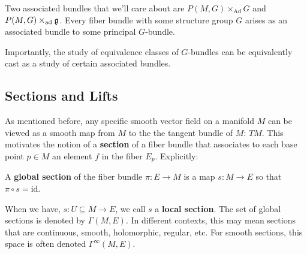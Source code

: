 		
%
		
		Two associated bundles that we'll care about are $P(M,G) \times_{\mathrm{Ad}} G$ and $P(M,G) \times_{\mathrm{ad}} \frak g$.
		Every fiber bundle with some structure group $G$ arises as an associated bundle to some principal $G$-bundle.
		
		Importantly, the study of equivalence classes of $G$-bundles can be equivalently cast as a study of certain associated bundles. 
		
		\subsection{Sections and Lifts}
		
		As mentioned before, any specific smooth vector field on a manifold $M$ can be viewed as a smooth map from $M$ to the the tangent bundle of $M$: $TM$. This motivates the notion of a \textbf{section} of a fiber bundle that associates to each base point $p\in M$ an element $f$ in the fiber $E_p$. Explicitly:
		\begin{defn}
			A \textbf{global section} of the fiber bundle $\pi: E \rightarrow M$ is a map $s: M \rightarrow E$ so that $\pi \circ s = \text{id}$. 
			
			When we have, $s: U \subseteq M \rightarrow E$, we call $s$ a \textbf{local section}. The set of global sections is denoted by $\Gamma(M, E)$. In different contexts, this may mean sections that are continuous, smooth, holomorphic, regular, etc. For smooth sections, this space is often denoted $\Gamma^\infty(M,E)$.
		\end{defn}
		
